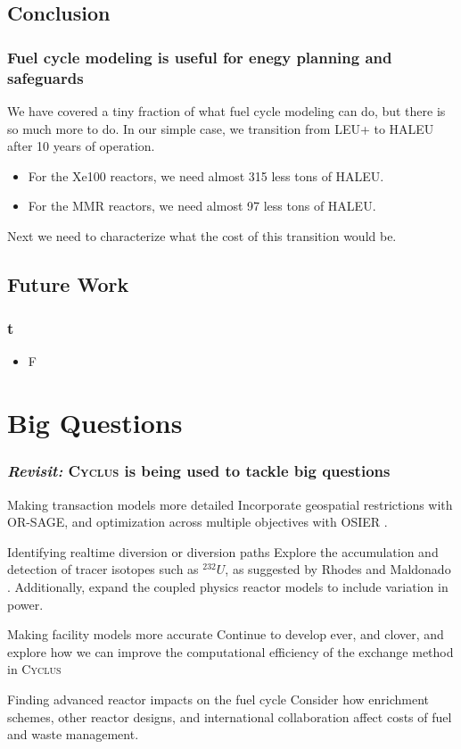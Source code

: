\documentclass[9pt]{beamer}
\newcommand{\cyclus}{\textsc{Cyclus}\xspace}
\begin{document}
  \subsection{Conclusion}
  \begin{frame}
      \frametitle{Fuel cycle modeling is useful for enegy planning and safeguards}
      We have covered a tiny fraction of what fuel cycle modeling can do, but there is so much more to do. In our simple case, we transition from LEU+ to HALEU after 10 years of operation.
      \begin{itemize}
          \item For the Xe100 reactors, we need almost 315 less tons of HALEU.
          \item For the MMR reactors, we need almost 97 less tons of HALEU.
      \end{itemize}
      Next we need to characterize what the cost of this transition would be.
  \end{frame}


  \subsection{Future Work}
  \begin{frame}
      \frametitle{t}
      \begin{itemize}
          \item F
      \end{itemize}
  \end{frame}

  \section{Big Questions}
  \begin{frame}
    \frametitle{\textit{Revisit:} \cyclus is being used to tackle big questions}
    \begin{block}{Making transaction models more detailed}
        Incorporate geospatial restrictions with OR-SAGE, and optimization across multiple objectives with OSIER \cite{Dotson_osier}.
    \end{block}
    \begin{block}{Identifying realtime diversion or diversion paths}
        Explore the accumulation and detection of tracer isotopes such as $^{232}U$, as suggested by Rhodes and Maldonado \cite{rhodes_u232}. Additionally, expand the coupled physics reactor models to include variation in power.
    \end{block}
    \begin{block}{Making facility models more accurate}
      Continue to develop \gls{ever}, and \gls{clover}, and explore how we can improve the computational efficiency of the exchange method in \cyclus
    \end{block}
    \begin{block}{Finding advanced reactor impacts on the fuel cycle}
      Consider how enrichment schemes, other reactor designs, and international collaboration affect costs of fuel and waste management.
    \end{block}
  \end{frame}
\end{document}
